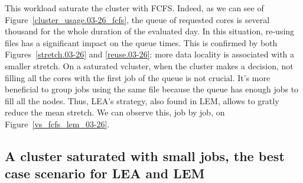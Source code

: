 \documentclass[conference,10pt]{IEEEtran}
\begin{document}
This workload saturate the cluster with FCFS. Indeed, 
as we can see of Figure~\ref{cluster_usage.03-26_fcfs}, the queue of requested cores is several thousand for the whole duration of the evaluated day.
In this situation, re-using files has a significant impact
on the queue times. This is confirmed by both Figures~\ref{stretch.03-26} and \ref{reuse.03-26}: more data locality is 
associated with a smaller stretch. On a saturated vcluster, when the cluster makes a decision, not filling all the cores with the first job of the queue is not crucial.
It's more beneficial to group jobs using the same file because the queue has enough jobs to fill all the nodes.
Thus, LEA's strategy, also found in LEM, allows to gratly reduce the mean stretch. We can observe this, job by job, on Figure~\ref{vs_fcfs_lem_03-26}.


\subsection{A cluster saturated with small jobs, the best case scenario for LEA and LEM}
\end{document}
